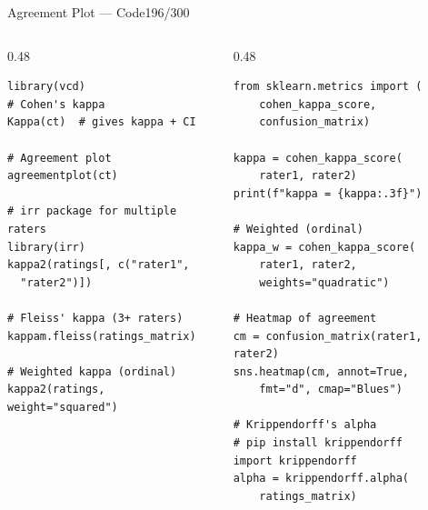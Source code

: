 \documentclass[10pt]{beamer}
\newcommand{\smark}[1]{\hfill{\scriptsize\color{codegray}#1}}
\begin{document}
\begin{frame}[fragile]{Agreement Plot --- Code}\smark{196/300}
\begin{columns}[T]
\begin{column}{0.48\textwidth}
\begin{lstlisting}[style=Rstyle]
library(vcd)
# Cohen's kappa
Kappa(ct)  # gives kappa + CI

# Agreement plot
agreementplot(ct)

# irr package for multiple raters
library(irr)
kappa2(ratings[, c("rater1",
  "rater2")])

# Fleiss' kappa (3+ raters)
kappam.fleiss(ratings_matrix)

# Weighted kappa (ordinal)
kappa2(ratings, weight="squared")
\end{lstlisting}
\end{column}
\begin{column}{0.48\textwidth}
\begin{lstlisting}[style=Pystyle]
from sklearn.metrics import (
    cohen_kappa_score,
    confusion_matrix)

kappa = cohen_kappa_score(
    rater1, rater2)
print(f"kappa = {kappa:.3f}")

# Weighted (ordinal)
kappa_w = cohen_kappa_score(
    rater1, rater2,
    weights="quadratic")

# Heatmap of agreement
cm = confusion_matrix(rater1, rater2)
sns.heatmap(cm, annot=True,
    fmt="d", cmap="Blues")

# Krippendorff's alpha
# pip install krippendorff
import krippendorff
alpha = krippendorff.alpha(
    ratings_matrix)
\end{lstlisting}
\end{column}
\end{columns}
\end{frame}
\end{document}
